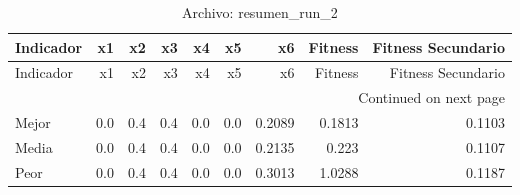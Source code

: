 \begin{longtable}{lrrrrrrrr}
\caption{Archivo: resumen\_run\_2}\label{tab:resumen_run_2} \\
\toprule
Indicador & x1 & x2 & x3 & x4 & x5 & x6 & Fitness & Fitness Secundario \\
\midrule
\endfirsthead
\toprule
Indicador & x1 & x2 & x3 & x4 & x5 & x6 & Fitness & Fitness Secundario \\
\midrule
\endhead
\midrule
\multicolumn{9}{r}{Continued on next page} \\
\midrule
\endfoot
\bottomrule
\endlastfoot
Mejor & 0.0 & 0.4 & 0.4 & 0.0 & 0.0 & 0.2089 & 0.1813 & 0.1103 \\
Media & 0.0 & 0.4 & 0.4 & 0.0 & 0.0 & 0.2135 & 0.223 & 0.1107 \\
Peor & 0.0 & 0.4 & 0.4 & 0.0 & 0.0 & 0.3013 & 1.0288 & 0.1187 \\
\end{longtable}